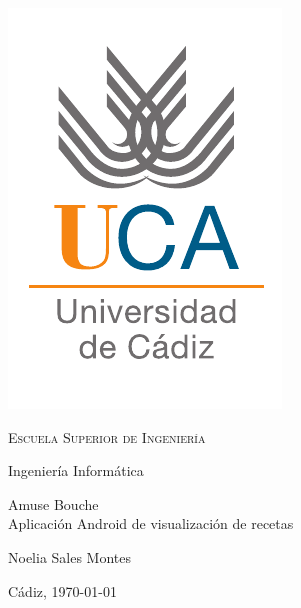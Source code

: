 \begin{titlepage}
  \centering
  \includegraphics[width=.3\textwidth]{previo/logo_uca}

  \bigskip
  \bigskip
  \bigskip

  \begin{changemargin}{2em}{2em}
    \centering

    {\Huge \textsc{\nohyphens{Escuela Superior de Ingeniería}}}

    \bigskip
    \bigskip
    \bigskip

    {\huge \nohyphens{Ingeniería Informática}}

    \bigskip
    \bigskip
    \bigskip
    \bigskip
    \bigskip
    \bigskip

    \begin{doublespace}
      {\LARGE \nohyphens{Amuse Bouche\\Aplicación Android de visualización de recetas}}
    \end{doublespace}


    \bigskip
    \bigskip
    \bigskip
    \bigskip

    \bigskip
    \bigskip
    \bigskip
    \bigskip
    \bigskip
    \bigskip
    \bigskip

  \end{changemargin}

  {\Large Noelia Sales Montes \\}

  \bigskip

  {\large Cádiz, \today}

\end{titlepage}
